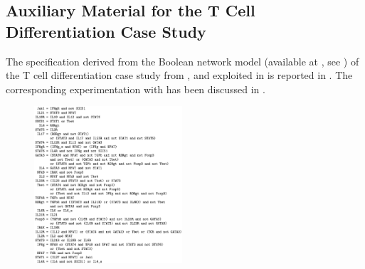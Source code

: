 \subsection{Auxiliary Material for the T Cell Differentiation Case Study}\label{app:maude}

The \BioResolve specification derived from the Boolean network model (available at \cite{ModelCellCollective}, see ) of the T cell differentiation case study from \cite{puniya2018mechanistic}, and exploited in \cite{datamod2023} is reported in . The corresponding experimentation with \GROOVE has been discussed in .




\begin{figure}[t]
	\begin{center}
		\includegraphics[width=0.49\textwidth]{figs-datamod2023/TcellBN.png}
	\end{center}

\end{figure}
